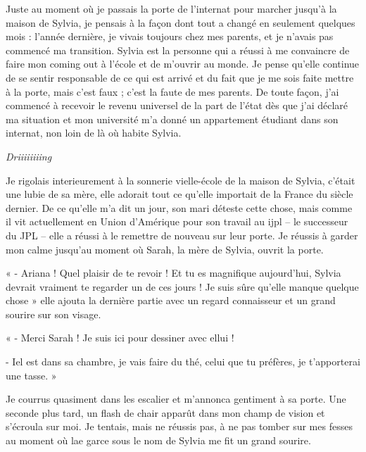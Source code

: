 \documentclass[12pt,colorlinks,a4paper]{book}
\begin{document}
\bigskip

Juste au moment où je passais la porte de l'internat pour marcher
jusqu'à la maison de Sylvia, je pensais à la façon dont tout a changé
en seulement quelques mois : l'année dernière, je vivais toujours
chez mes parents, et je n'avais pas commencé ma transition. Sylvia
est la personne qui a réussi à me convaincre de faire mon coming out
à l'école et de m'ouvrir au monde. Je pense qu'elle continue de se
sentir responsable de ce qui est arrivé et du fait que je me sois
faite mettre à la porte, mais c'est faux ; c'est la faute de mes parents.
De toute façon, j'ai commencé à recevoir le revenu universel de la
part de l'état dès que j'ai déclaré ma situation et mon université
m'a donné un appartement étudiant dans son internat, non loin de là
où habite Sylvia.\par

\bigskip

\textit{Driiiiiiiing}\par

Je rigolais interieurement à la sonnerie vielle-école de la maison
de Sylvia, c'était une lubie de sa mère, elle adorait tout ce qu'elle
importait de la France du siècle dernier. De ce qu'elle m'a dit un
jour, son mari déteste cette chose, mais comme il vit actuellement
en Union d'Amérique pour son travail au \gls{ijpl} -- le successeur
du JPL -- elle a réussi à le remettre de nouveau sur leur porte.
Je réussis à garder mon calme jusqu'au moment où Sarah, la mère de
Sylvia, ouvrit la porte.\par

\bigskip

« - Ariana ! Quel plaisir de te revoir ! Et tu es magnifique aujourd'hui,
Sylvia devrait vraiment te regarder un de ces jours ! Je suis sûre
qu'elle manque quelque chose » elle ajouta la dernière partie avec
un regard connaisseur et un grand sourire sur son visage.

« - Merci Sarah ! Je suis ici pour dessiner avec ellui !

- Iel est dans sa chambre, je vais faire du thé, celui que tu préfères,
je t'apporterai une tasse. »

\bigskip

Je courrus quasiment dans les escalier et m'annonca gentiment à sa
porte. Une seconde plus tard, un flash de chair apparût dans mon champ
de vision et s'écroula sur moi. Je tentais, mais ne réussis pas, à
ne pas tomber sur mes fesses au moment où lae garce sous le nom de
Sylvia me fit un grand sourire.\par
\end{document}
